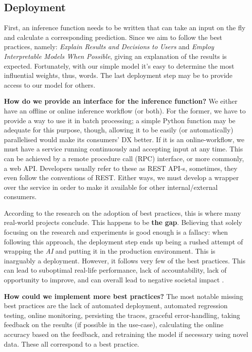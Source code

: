 \subsection{Deployment}

First, an inference function needs to be written that can take an input on the fly and calculate a corresponding prediction. Since we aim to follow the best practices, namely: \textit{Explain Results and Decisions to Users} and \textit{Employ Interpretable Models When Possible}, giving an explanation of the results is expected. Fortunately, with our simple model it's easy to determine the most influential weights, thus, words. The last deployment step may be to provide access to our model for others.

\begin{displayquote}
\textbf{How do we provide an interface for the inference function?} We either have an offline or online inference workflow (or both). For the former, we have to provide a way to use it in batch processing; a simple Python function may be adequate for this purpose, though, allowing it to be easily (or automatically) parallelised would make its consumers' DX better. If it is an online-workflow, we must have a service running continuously and accepting input at any time. This can be achieved by a remote procedure call (RPC) interface, or more commonly, a web API. Developers usually refer to these as REST API-s, sometimes, they even follow the conventions of REST. Either ways, we must develop a wrapper over the service in order to make it available for other internal/external consumers.
\end{displayquote}

According to the research on the adoption of best practices, this is where many real-world projects conclude. This happens to be \textbf{the gap}. Believing that solely focusing on the research and experiments is good enough is a fallacy: when following this approach, the deployment step ends up being a rushed attempt of wrapping the \textit{AI} and putting it in the production environment. This is inarguably a deployment. However, it follows very few of the best practices. This can lead to suboptimal real-life performance, lack of accountability, lack of opportunity to improve, and can overall lead to negative societal impact \cite{o2016weapons}.

\begin{displayquote}
\textbf{How could we implement more best practices?} The most notable missing best practices are the lack of automated deployment, automated regression testing, online monitoring, persisting the traces, graceful error-handling, taking feedback on the results (if possible in the use-case), calculating the online accuracy based on the feedback, and retraining the model if necessary using novel data. These all correspond to a best practice.
\end{displayquote}
